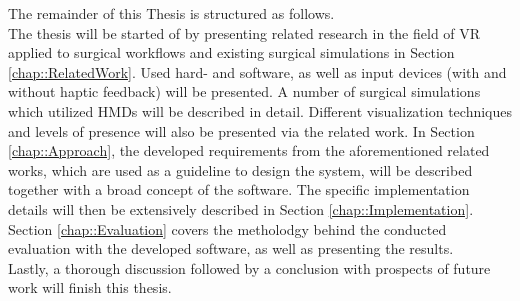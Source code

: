 The remainder of this Thesis is structured as follows.
\\ The thesis will be started of by presenting related research in the field of VR applied to surgical workflows and existing surgical simulations in Section \ref{chap::RelatedWork}.
Used hard- and software, as well as input devices (with and without haptic feedback) will be presented.
A number of surgical simulations which utilized HMDs will be described in detail.
Different visualization techniques and levels of presence will also be presented via the related work.
In Section \ref{chap::Approach}, the developed requirements from the aforementioned related works, which are used as a guideline to design the system, will be described together with a broad concept of the software.
The specific implementation details will then be extensively described in Section \ref{chap::Implementation}.
Section \ref{chap::Evaluation} covers the metholodgy behind the conducted evaluation with the developed software, as well as presenting the results.
\\ Lastly, a thorough discussion followed by a conclusion with prospects of future work will finish this thesis.